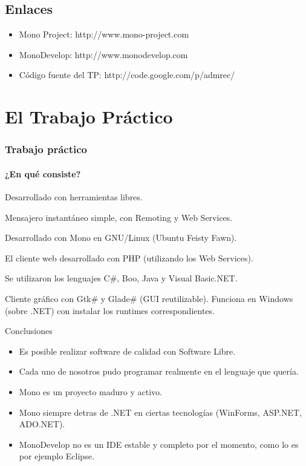 \documentclass{beamer}
\begin{document}
\subsection{Enlaces}

\begin{frame}
  \begin{itemize}
    \item Mono Project: http://www.mono-project.com
    \item MonoDevelop: http://www.monodevelop.com
    \item Código fuente del TP: http://code.google.com/p/admrec/
  \end{itemize}
\end{frame}


\section{El Trabajo Práctico}

\begin{frame}
  \frametitle{Trabajo práctico}
  \framesubtitle{¿En qué consiste?}

  \begin{itemize}
   \begin{small}
    \item Desarrollado con herramientas libres.
    \item Mensajero instantáneo simple, con Remoting y Web Services.
    \item Desarrollado con Mono en GNU/Linux (Ubuntu Feisty Fawn).
    \item El cliente web desarrollado con PHP (utilizando los Web Services).
    \item Se utilizaron los lenguajes C\#, Boo, Java y Visual Basic.NET.
    \item Cliente gráfico con Gtk\# y Glade\# (GUI reutilizable). Funciona
      en Windows (sobre .NET) con instalar los runtimes correspondientes.
   \end{small}
  \end{itemize}
\end{frame}

\begin{frame}{Conclusiones}
  \begin{itemize}
    \item Es posible realizar software de calidad con Software Libre.
    \item Cada uno de nosotros pudo programar realmente en el lenguaje que quería.
    \item Mono es un proyecto maduro y activo.
    \item \alert{Mono siempre detras de .NET en ciertas tecnologías (WinForms, ASP.NET, ADO.NET).}
    \item \alert{MonoDevelop no es un IDE estable y completo por el momento, como lo es por ejemplo Eclipse.}
  \end{itemize}
\end{frame}
\end{document}
